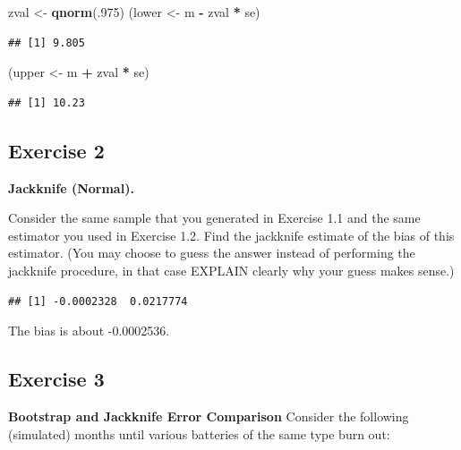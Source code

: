 \documentclass[
]{article}
\newenvironment{Shaded}{\begin{snugshade}}{\end{snugshade}}
\newcommand{\DecValTok}[1]{\textcolor[rgb]{0.00,0.00,0.81}{#1}}
\newcommand{\KeywordTok}[1]{\textcolor[rgb]{0.13,0.29,0.53}{\textbf{#1}}}
\newcommand{\NormalTok}[1]{#1}
\newcommand{\OperatorTok}[1]{\textcolor[rgb]{0.81,0.36,0.00}{\textbf{#1}}}
\newcommand{\StringTok}[1]{\textcolor[rgb]{0.31,0.60,0.02}{#1}}
\begin{document}
\begin{Shaded}
\begin{Highlighting}[]
\NormalTok{zval <-}\StringTok{ }\KeywordTok{qnorm}\NormalTok{(.}\DecValTok{975}\NormalTok{)}
\NormalTok{(lower <-}\StringTok{ }\NormalTok{m }\OperatorTok{-}\StringTok{ }\NormalTok{zval }\OperatorTok{*}\StringTok{ }\NormalTok{se)}
\end{Highlighting}
\end{Shaded}

\begin{verbatim}
## [1] 9.805
\end{verbatim}

\begin{Shaded}
\begin{Highlighting}[]
\NormalTok{(upper <-}\StringTok{ }\NormalTok{m }\OperatorTok{+}\StringTok{ }\NormalTok{zval }\OperatorTok{*}\StringTok{ }\NormalTok{se)}
\end{Highlighting}
\end{Shaded}

\begin{verbatim}
## [1] 10.23
\end{verbatim}

\hypertarget{exercise-2}{%
\subsection{Exercise 2}\label{exercise-2}}

\textbf{Jackknife (Normal).}

Consider the same sample that you generated in Exercise 1.1 and the same
estimator you used in Exercise 1.2. Find the jackknife estimate of the
bias of this estimator. (You may choose to guess the answer instead of
performing the jackknife procedure, in that case EXPLAIN clearly why
your guess makes sense.)

\begin{verbatim}
## [1] -0.0002328  0.0217774
\end{verbatim}

The bias is about -0.0002536.

\hypertarget{exercise-3}{%
\subsection{Exercise 3}\label{exercise-3}}

\textbf{Bootstrap and Jackknife Error Comparison} Consider the following
(simulated) months until various batteries of the same type burn out:
\end{document}
